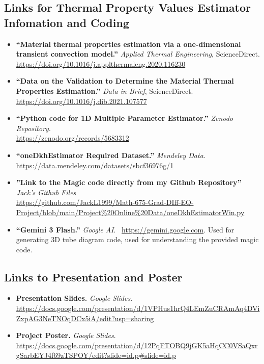 \documentclass[11pt]{article}
\begin{document}
{\begin{itemize}
    \end{itemize}

    \subsection*{Links for Thermal Property Values Estimator Infomation and Coding}

    \begin{itemize}
        \item \textbf{``Material thermal properties estimation via a one-dimensional transient convection model.''} \textit{Applied Thermal Engineering}, ScienceDirect. \\ 
        \url{https://doi.org/10.1016/j.applthermaleng.2020.116230}
        
        \item \textbf{``Data on the Validation to Determine the Material Thermal Properties Estimation.''} \textit{Data in Brief}, ScienceDirect. \\ 
        \url{https://doi.org/10.1016/j.dib.2021.107577}
        
        \item \textbf{``Python code for 1D Multiple Parameter Estimator.''} \textit{Zenodo Repository}. \\ 
        \url{https://zenodo.org/records/5683312}
        
        \item \textbf{``oneDkhEstimator Required Dataset.''} \textit{Mendeley Data}. \\ 
        \url{https://data.mendeley.com/datasets/sbcf36976g/1}

        \item \textbf{''Link to the Magic code directly from my Github Repository''} \textit{Jack's Github Files} \\
        \url{https://github.com/JackL1999/Math-675-Grad-DIff-EQ-Project/blob/main/Project%20Online%20Data/oneDkhEstimatorWin.py}

        \item \textbf{``Gemini 3 Flash.''} \textit{Google AI}. \ \url{https://gemini.google.com}.
        \newline Used for generating 3D tube diagram code, used for understanding the provided magic code.
    \end{itemize}

    \subsection*{Links to Presentation and Poster}
    \begin{itemize}
        \item \textbf{Presentation Slides.} \textit{Google Slides}. \\ 
        \url{https://docs.google.com/presentation/d/1VPHus1hrQ4LEmZuCRAmAq4DViZxpAG3NeTNOqDCx5iA/edit?usp=sharing}
            
        \item \textbf{Project Poster.} \textit{Google Slides}. \\ 
        \url{https://docs.google.com/presentation/d/12PqFTOBQ9jGK5aHqCC0VSaQxrgSarbEYJ4f69zTSPOY/edit?slide=id.p#slide=id.p}

    \end{itemize}
}
\end{document}
